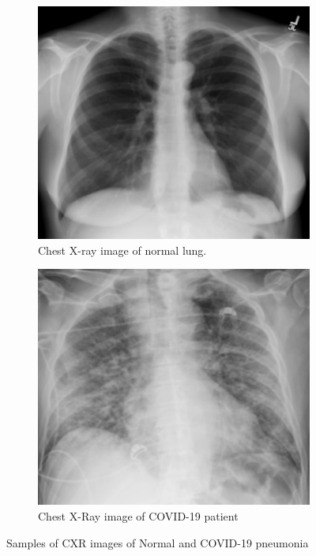 \begin{figure}%
    \centering
    \begin{subfigure}[b]{0.4\textwidth}
        \centering
        \includegraphics[width=\textwidth]{Figures/introNormCXR.png}
        \caption{Chest X-ray image of normal lung.}
        \label{NorCXR}
    \end{subfigure}
     \begin{subfigure}[b]{0.4\textwidth}
         \centering
         \includegraphics[width=\textwidth]{Figures/intoCovidCXR.png}
         \caption{Chest X-Ray image of COVID-19 patient}
         \label{CovCXR}
     \end{subfigure}
    \caption{Samples of CXR images of Normal and COVID-19 pneumonia}%
    \label{NorCovCXR}%
\end{figure}
